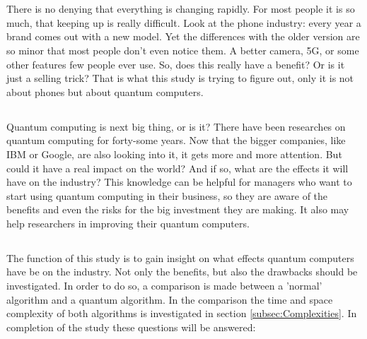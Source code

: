 
\chapter{}
\label{ch:inleiding}

There is no denying that everything is changing rapidly. For most people it is so much, that keeping up is really difficult.
Look at the phone industry: every year a brand comes out with a new model. Yet the differences with the older version are so minor that most people don't even notice them.
A better camera, 5G, or some other features few people ever use. So, does this really have a benefit? Or is it just a selling trick?
That is what this study is trying to figure out, only it is not about phones but about quantum computers.

\section{}
\label{sec:probleemstelling}
Quantum computing is next big thing, or is it? There have been researches on quantum computing for forty-some years.
Now that the bigger companies, like IBM or Google, are also looking into it, it gets more and more attention. 
But could it have a real impact on the world? And if so, what are the effects it will have on the industry?
This knowledge can be helpful for managers who want to start using quantum computing in their business, so they are aware of the benefits and even the risks for the big investment they are making.
It also may help researchers in improving their quantum computers.

\section{}
\label{sec:onderzoeksvraag}

The function of this study is to gain insight on what effects quantum computers have be on the industry.
Not only the benefits, but also the drawbacks should be investigated. In order to do so, a comparison is made between a 'normal' algorithm and a quantum algorithm.
In the comparison the time and space complexity of both algorithms is investigated in section \ref*{subsec:Complexities}.
In completion of the study these questions will be answered:

